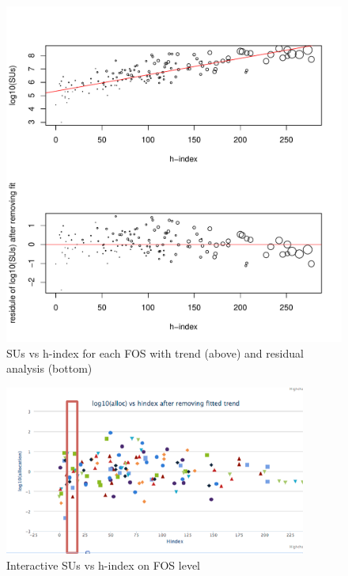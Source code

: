 \begin{figure}[htb]
  \centering
    \includegraphics[width=1.0\columnwidth]{images/05_alloc_vs_hindex_fos_sized_2in1.pdf}
  \caption{SUs vs h-index for each FOS with trend (above) and residual analysis (bottom)}\label{F:alloc-vs-hindex-fos-sized}
\end{figure}



\begin{figure}[htb]
  \centering
    \includegraphics[width=1.0\columnwidth]{images/fig3.pdf}
  \caption{Interactive SUs vs h-index on FOS level}\label{F:fig3}
\end{figure}

